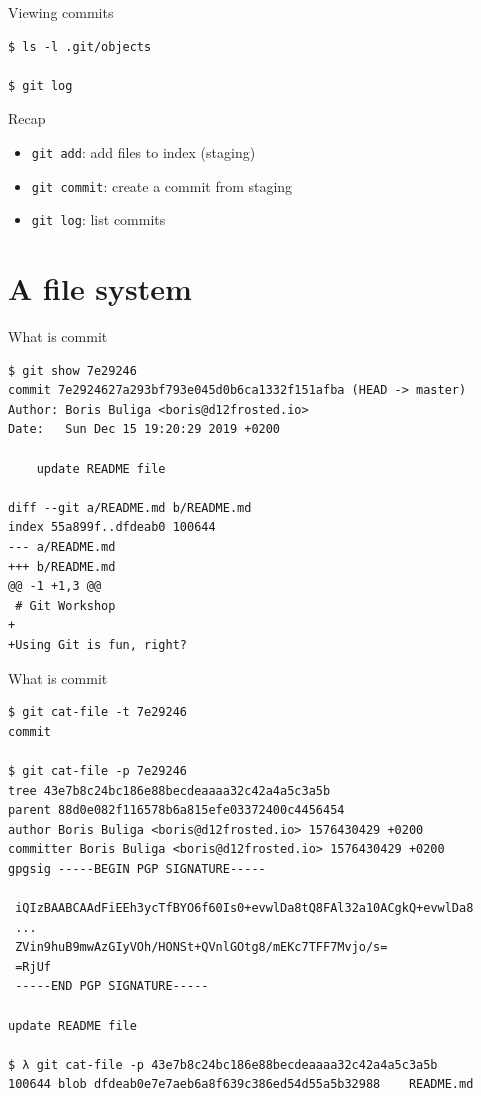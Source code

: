 \documentclass[presentation,aspectratio=169,smaller]{beamer}
\begin{document}
\begin{frame}[label={sec:org11f5057},fragile]{Viewing commits}
 \begin{verbatim}
$ ls -l .git/objects

$ git log
\end{verbatim}
\end{frame}

\begin{frame}[label={sec:org0dff325},fragile]{Recap}
 \begin{itemize}
\item \texttt{git add}: add files to index (staging)
\item \texttt{git commit}: create a commit from staging
\item \texttt{git log}: list commits
\end{itemize}
\end{frame}

\section{A file system}
\label{sec:org9d3cb33}

\begin{frame}[label={sec:org5bd84ec},fragile]{What is commit}
 \begin{verbatim}
$ git show 7e29246
commit 7e2924627a293bf793e045d0b6ca1332f151afba (HEAD -> master)
Author: Boris Buliga <boris@d12frosted.io>
Date:   Sun Dec 15 19:20:29 2019 +0200

    update README file

diff --git a/README.md b/README.md
index 55a899f..dfdeab0 100644
--- a/README.md
+++ b/README.md
@@ -1 +1,3 @@
 # Git Workshop
+
+Using Git is fun, right?
\end{verbatim}
\end{frame}

\begin{frame}[label={sec:orgcbe6edb},fragile]{What is commit}
 \begin{verbatim}
$ git cat-file -t 7e29246
commit

$ git cat-file -p 7e29246
tree 43e7b8c24bc186e88becdeaaaa32c42a4a5c3a5b
parent 88d0e082f116578b6a815efe03372400c4456454
author Boris Buliga <boris@d12frosted.io> 1576430429 +0200
committer Boris Buliga <boris@d12frosted.io> 1576430429 +0200
gpgsig -----BEGIN PGP SIGNATURE-----

 iQIzBAABCAAdFiEEh3ycTfBYO6f60Is0+evwlDa8tQ8FAl32a10ACgkQ+evwlDa8
 ...
 ZVin9huB9mwAzGIyVOh/HONSt+QVnlGOtg8/mEKc7TFF7Mvjo/s=
 =RjUf
 -----END PGP SIGNATURE-----

update README file

$ λ git cat-file -p 43e7b8c24bc186e88becdeaaaa32c42a4a5c3a5b
100644 blob dfdeab0e7e7aeb6a8f639c386ed54d55a5b32988	README.md
\end{verbatim}
\end{frame}
\end{document}
